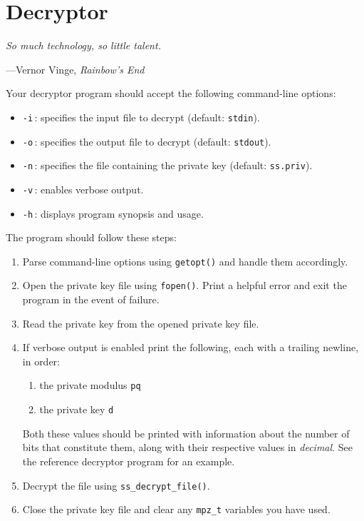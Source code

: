 \section{Decryptor}
\textwidth
\epigraph{\emph{So much technology, so little talent.}}{---Vernor Vinge, \emph{Rainbow's End}}

\noindent
Your decryptor program should accept the following command-line options:
\begin{itemize}
  \item \texttt{-i}\,: specifies the input file to decrypt (default:
    \texttt{stdin}).
  \item \texttt{-o}\,: specifies the output file to decrypt (default:
    \texttt{stdout}).
  \item \texttt{-n}\,: specifies the file containing the private key
    (default: \texttt{ss.priv}).
  \item \texttt{-v}\,: enables verbose output.
  \item \texttt{-h}\,: displays program synopsis and usage.
\end{itemize}
The program should follow these steps:
\begin{enumerate}
  \item Parse command-line options using \texttt{getopt()} and handle
    them accordingly.
  \item Open the private key file using \texttt{fopen()}. Print a helpful
    error and exit the program in the event of failure.
  \item Read the private key from the opened private key file.
  \item If verbose output is enabled print the following, each with a
    trailing newline, in order:
    \begin{enumerate}
      \item the private modulus \texttt{pq}
      \item the private key \texttt{d}
    \end{enumerate}
    Both these values should be printed with information about the
    number of bits that constitute them, along with their respective
    values in \emph{decimal}. See the reference decryptor program for an
    example.
  \item Decrypt the file using \texttt{ss\_decrypt\_file()}.
  \item Close the private key file and clear any \texttt{mpz\_t}
    variables you have used.
\end{enumerate}

